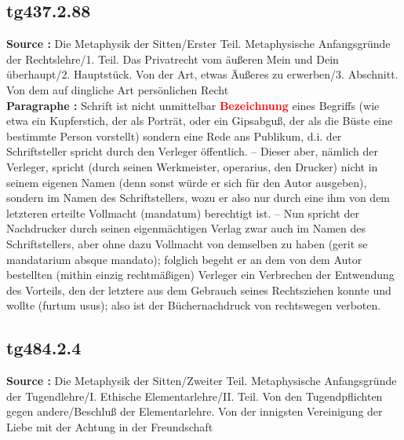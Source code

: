 \documentclass[a4paper,12pt,twoside]{book}
\newcommand{\match}[1]{\textcolor{red}{\textbf{#1}}}
\begin{document}
	\subsection*{tg437.2.88} 
	\textbf{Source : }Die Metaphysik der Sitten/Erster Teil. Metaphysische Anfangsgründe der Rechtslehre/1. Teil. Das Privatrecht vom äußeren Mein und Dein überhaupt/2. Hauptstück. Von der Art, etwas Äußeres zu erwerben/3. Abschnitt. Von dem auf dingliche Art persönlichen Recht\\  
	
	\textbf{Paragraphe : }
	Schrift ist nicht unmittelbar \match{Bezeichnung} eines Begriffs (wie etwa ein Kupferstich, der als Porträt, oder ein Gipsabguß, der als die Büste eine bestimmte Person vorstellt) sondern eine Rede ans Publikum, d.i. der Schriftsteller spricht durch den Verleger öffentlich. – Dieser aber, nämlich der Verleger, spricht (durch seinen Werkmeister, operarius, den Drucker) nicht in seinem eigenen Namen (denn sonst würde er sich für den Autor ausgeben), sondern im Namen des Schriftstellers, wozu er also nur durch eine ihm von dem letzteren erteilte Vollmacht (mandatum) berechtigt ist. – Nun spricht der Nachdrucker durch seinen eigenmächtigen Verlag zwar auch im Namen des Schriftstellers, aber ohne dazu Vollmacht von demselben zu haben (gerit se mandatarium absque mandato); folglich begeht er an dem von dem Autor bestellten (mithin einzig rechtmäßigen)  Verleger ein Verbrechen der Entwendung des Vorteils, den der letztere aus dem Gebrauch seines Rechtsziehen konnte und wollte (furtum usus); also ist der Büchernachdruck von rechtswegen verboten. 
	
	\subsection*{tg484.2.4} 
	\textbf{Source : }Die Metaphysik der Sitten/Zweiter Teil. Metaphysische Anfangsgründe der Tugendlehre/I. Ethische Elementarlehre/II. Teil. Von den Tugendpflichten gegen andere/Beschluß der Elementarlehre. Von der innigsten Vereinigung der Liebe mit der Achtung in der Freundschaft\\  
	
\end{document}
